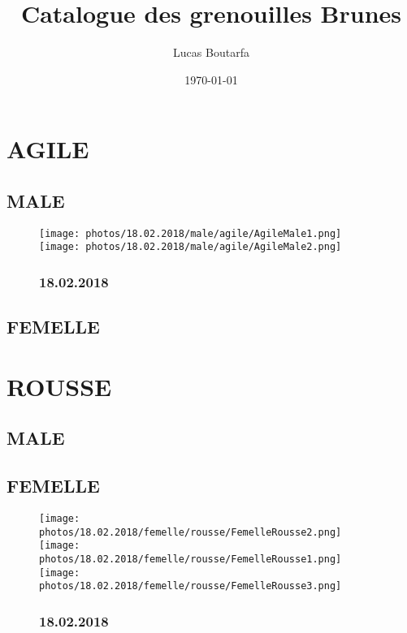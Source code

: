 \documentclass{article}%
\title{Catalogue des grenouilles Brunes}%
\author{Lucas Boutarfa}%
\date{\today}%
\begin{document}
%
\normalsize%
\maketitle%
\section{AGILE}%
\subsection{MALE}%


\begin{figure}[h!]%
\centering%
\texttt{[image: photos/18.02.2018/male/agile/AgileMale1.png]}%
\centering%
\texttt{[image: photos/18.02.2018/male/agile/AgileMale2.png]}%
\subsubsection{18.02.2018}%

%
\end{figure}

%
\clearpage

%
\subsection{FEMELLE}%

%
\section{ROUSSE}%
\subsection{MALE}%

%
\subsection{FEMELLE}%


\begin{figure}[h!]%
\centering%
\texttt{[image: photos/18.02.2018/femelle/rousse/FemelleRousse2.png]}%
\centering%
\texttt{[image: photos/18.02.2018/femelle/rousse/FemelleRousse1.png]}%
\centering%
\texttt{[image: photos/18.02.2018/femelle/rousse/FemelleRousse3.png]}%
\subsubsection{18.02.2018}%

%
\end{figure}

%
\clearpage

%
\end{document}
